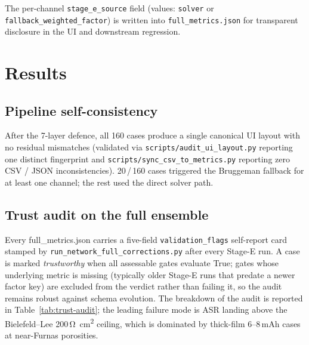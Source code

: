 \documentclass[11pt, a4paper]{article}
\begin{document}
The per-channel \texttt{stage\_e\_source} field
(values: \texttt{solver} or \texttt{fallback\_weighted\_factor})
is written into \texttt{full\_metrics.json} for transparent
disclosure in the UI and downstream regression.

\section{Results}
\label{sec:results}

\subsection{Pipeline self-consistency}
After the 7-layer defence, all 160 cases produce a single
canonical UI layout with no residual mismatches (validated via
\texttt{scripts/audit\_ui\_layout.py} reporting one distinct
fingerprint and \texttt{scripts/sync\_csv\_to\_metrics.py} reporting
zero CSV / JSON inconsistencies). 20\,/\,160 cases triggered the
Bruggeman fallback for at least one channel; the rest used the
direct solver path.

\subsection{Trust audit on the full ensemble}
\label{sec:trust-audit}
Every full\_metrics.json carries a five-field
\texttt{validation\_flags} self-report card stamped by
\texttt{run\_network\_full\_corrections.py} after every Stage-E
run.  A case is marked \emph{trustworthy} when all assessable
gates evaluate True; gates whose underlying metric is missing
(typically older Stage-E runs that predate a newer factor key) are
excluded from the verdict rather than failing it, so the audit
remains robust against schema evolution. The breakdown of the
audit is reported in Table~\ref{tab:trust-audit}; the leading
failure mode is ASR landing above the Bielefeld--Lee 200\,\si
{\ohm\square\centi\metre} ceiling, which is dominated by
thick-film 6--8\,mAh cases at near-Furnas porosities.


\end{document}
